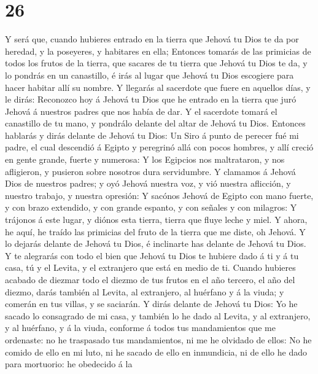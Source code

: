 \hypertarget{section-25}{%
\section{26}\label{section-25}}

 Y será que, cuando hubieres entrado en la tierra que Jehová
tu Dios te da por heredad, y la poseyeres, y habitares en ella;
 Entonces tomarás de las primicias de todos los frutos de la
tierra, que sacares de tu tierra que Jehová tu Dios te da, y lo pondrás
en un canastillo, é irás al lugar que Jehová tu Dios escogiere para
hacer habitar allí su nombre.  Y llegarás al sacerdote que
fuere en aquellos días, y le dirás: Reconozco hoy á Jehová tu Dios que
he entrado en la tierra que juró Jehová á nuestros padres que nos había
de dar.  Y el sacerdote tomará el canastillo de tu mano, y
pondrálo delante del altar de Jehová tu Dios.  Entonces
hablarás y dirás delante de Jehová tu Dios: Un Siro á punto de perecer
fué mi padre, el cual descendió á Egipto y peregrinó allá con pocos
hombres, y allí creció en gente grande, fuerte y numerosa: 
Y los Egipcios nos maltrataron, y nos afligieron, y pusieron sobre
nosotros dura servidumbre.  Y clamamos á Jehová Dios de
nuestros padres; y oyó Jehová nuestra voz, y vió nuestra aflicción, y
nuestro trabajo, y nuestra opresión:  Y sacónos Jehová de
Egipto con mano fuerte, y con brazo extendido, y con grande espanto, y
con señales y con milagros:  Y trájonos á este lugar, y
diónos esta tierra, tierra que fluye leche y miel.  Y
ahora, he aquí, he traído las primicias del fruto de la tierra que me
diste, oh Jehová. Y lo dejarás delante de Jehová tu Dios, é inclinarte
has delante de Jehová tu Dios.  Y te alegrarás con todo el
bien que Jehová tu Dios te hubiere dado á ti y á tu casa, tú y el
Levita, y el extranjero que está en medio de ti.  Cuando
hubieres acabado de diezmar todo el diezmo de tus frutos en el año
tercero, el año del diezmo, darás también al Levita, al extranjero, al
huérfano y á la viuda; y comerán en tus villas, y se saciarán.
 Y dirás delante de Jehová tu Dios: Yo he sacado lo
consagrado de mi casa, y también lo he dado al Levita, y al extranjero,
y al huérfano, y á la viuda, conforme á todos tus mandamientos que me
ordenaste: no he traspasado tus mandamientos, ni me he olvidado de
ellos:  No he comido de ello en mi luto, ni he sacado de
ello en inmundicia, ni de ello he dado para mortuorio: he obedecido á la
